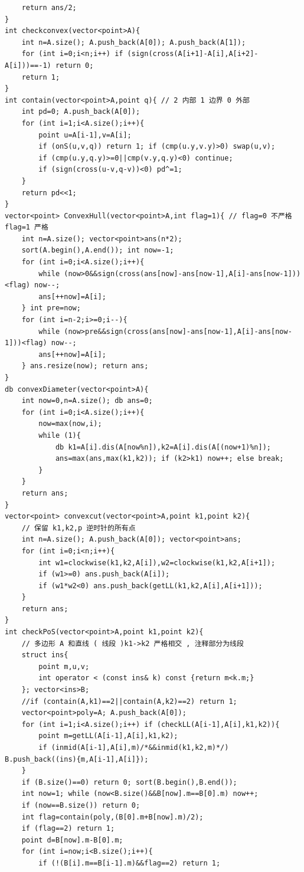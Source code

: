 \documentclass[twoside]{article}
\begin{document}
\begin{lstlisting}
    return ans/2;
}
int checkconvex(vector<point>A){
    int n=A.size(); A.push_back(A[0]); A.push_back(A[1]);
    for (int i=0;i<n;i++) if (sign(cross(A[i+1]-A[i],A[i+2]-A[i]))==-1) return 0;
    return 1;
}
int contain(vector<point>A,point q){ // 2 内部 1 边界 0 外部
    int pd=0; A.push_back(A[0]);
    for (int i=1;i<A.size();i++){
        point u=A[i-1],v=A[i];
        if (onS(u,v,q)) return 1; if (cmp(u.y,v.y)>0) swap(u,v);
        if (cmp(u.y,q.y)>=0||cmp(v.y,q.y)<0) continue;
        if (sign(cross(u-v,q-v))<0) pd^=1;
    }
    return pd<<1;
}
vector<point> ConvexHull(vector<point>A,int flag=1){ // flag=0 不严格 flag=1 严格 
    int n=A.size(); vector<point>ans(n*2); 
    sort(A.begin(),A.end()); int now=-1;
    for (int i=0;i<A.size();i++){
        while (now>0&&sign(cross(ans[now]-ans[now-1],A[i]-ans[now-1]))<flag) now--;
        ans[++now]=A[i];
    } int pre=now;
    for (int i=n-2;i>=0;i--){
        while (now>pre&&sign(cross(ans[now]-ans[now-1],A[i]-ans[now-1]))<flag) now--;
        ans[++now]=A[i];
    } ans.resize(now); return ans;
}
db convexDiameter(vector<point>A){
    int now=0,n=A.size(); db ans=0;
    for (int i=0;i<A.size();i++){
        now=max(now,i);
        while (1){
            db k1=A[i].dis(A[now%n]),k2=A[i].dis(A[(now+1)%n]);
            ans=max(ans,max(k1,k2)); if (k2>k1) now++; else break;
        }
    }
    return ans;
}
vector<point> convexcut(vector<point>A,point k1,point k2){
    // 保留 k1,k2,p 逆时针的所有点
    int n=A.size(); A.push_back(A[0]); vector<point>ans;
    for (int i=0;i<n;i++){
        int w1=clockwise(k1,k2,A[i]),w2=clockwise(k1,k2,A[i+1]);
        if (w1>=0) ans.push_back(A[i]);
        if (w1*w2<0) ans.push_back(getLL(k1,k2,A[i],A[i+1]));
    }
    return ans;
}
int checkPoS(vector<point>A,point k1,point k2){
    // 多边形 A 和直线 ( 线段 )k1->k2 严格相交 , 注释部分为线段
    struct ins{
        point m,u,v;
        int operator < (const ins& k) const {return m<k.m;}
    }; vector<ins>B;
    //if (contain(A,k1)==2||contain(A,k2)==2) return 1;
    vector<point>poly=A; A.push_back(A[0]); 
    for (int i=1;i<A.size();i++) if (checkLL(A[i-1],A[i],k1,k2)){
        point m=getLL(A[i-1],A[i],k1,k2); 
        if (inmid(A[i-1],A[i],m)/*&&inmid(k1,k2,m)*/) B.push_back((ins){m,A[i-1],A[i]});
    }
    if (B.size()==0) return 0; sort(B.begin(),B.end()); 
    int now=1; while (now<B.size()&&B[now].m==B[0].m) now++; 
    if (now==B.size()) return 0;
    int flag=contain(poly,(B[0].m+B[now].m)/2);
    if (flag==2) return 1;
    point d=B[now].m-B[0].m;
    for (int i=now;i<B.size();i++){
        if (!(B[i].m==B[i-1].m)&&flag==2) return 1;

\end{lstlisting}
\end{document}
